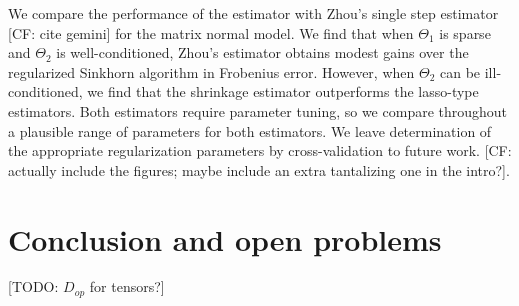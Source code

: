 \documentclass[aos]{imsart}
\theoremstyle{definition}
\numberwithin{equation}{section}
\newcommand{\CF}[1]{{\color{purple}[CF: #1]}}
\newcommand{\TODO}[1]{{\color{blue}[TODO: #1]}}
\begin{document}
We compare the performance of the estimator with Zhou's single step estimator \CF{cite gemini} for the matrix normal model. We find that when $\Theta_1$ is sparse and $\Theta_2$ is well-conditioned, Zhou's estimator obtains modest gains over the regularized Sinkhorn algorithm in Frobenius error. However, when $\Theta_2$ can be ill-conditioned, we find that the shrinkage estimator outperforms the lasso-type estimators. Both estimators require parameter tuning, so we compare throughout a plausible range of parameters for both estimators. We leave determination of the appropriate regularization parameters by cross-validation to future work. \CF{actually include the figures; maybe include an extra tantalizing one in the intro?}.






\section{Conclusion and open problems}
\TODO{$D_{op}$ for tensors?}
\end{document}

